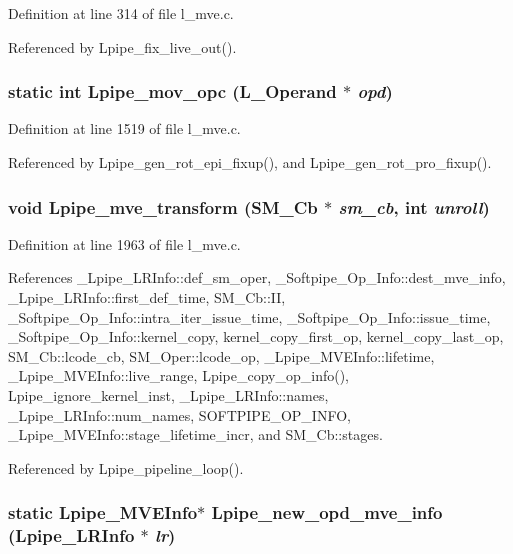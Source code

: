Definition at line 314 of file l\_\-mve.c.

Referenced by Lpipe\_\-fix\_\-live\_\-out().
\subsubsection{\setlength{\rightskip}{0pt plus 5cm}static int Lpipe\_\-mov\_\-opc (L\_\-Operand $\ast$ {\em opd})\hspace{0.3cm}{\tt  [static]}}\label{l__mve_8c_dbcc1c6752c12e5d507c9bb136143844}




Definition at line 1519 of file l\_\-mve.c.

Referenced by Lpipe\_\-gen\_\-rot\_\-epi\_\-fixup(), and Lpipe\_\-gen\_\-rot\_\-pro\_\-fixup().
\subsubsection{\setlength{\rightskip}{0pt plus 5cm}void Lpipe\_\-mve\_\-transform (\bf{SM\_\-Cb} $\ast$ {\em sm\_\-cb}, int {\em unroll})}\label{l__mve_8c_b3521b99ecff5fb6e631fe1caa6d81bc}




Definition at line 1963 of file l\_\-mve.c.

References \_\-Lpipe\_\-LRInfo::def\_\-sm\_\-oper, \_\-Softpipe\_\-Op\_\-Info::dest\_\-mve\_\-info, \_\-Lpipe\_\-LRInfo::first\_\-def\_\-time, SM\_\-Cb::II, \_\-Softpipe\_\-Op\_\-Info::intra\_\-iter\_\-issue\_\-time, \_\-Softpipe\_\-Op\_\-Info::issue\_\-time, \_\-Softpipe\_\-Op\_\-Info::kernel\_\-copy, kernel\_\-copy\_\-first\_\-op, kernel\_\-copy\_\-last\_\-op, SM\_\-Cb::lcode\_\-cb, SM\_\-Oper::lcode\_\-op, \_\-Lpipe\_\-MVEInfo::lifetime, \_\-Lpipe\_\-MVEInfo::live\_\-range, Lpipe\_\-copy\_\-op\_\-info(), Lpipe\_\-ignore\_\-kernel\_\-inst, \_\-Lpipe\_\-LRInfo::names, \_\-Lpipe\_\-LRInfo::num\_\-names, SOFTPIPE\_\-OP\_\-INFO, \_\-Lpipe\_\-MVEInfo::stage\_\-lifetime\_\-incr, and SM\_\-Cb::stages.

Referenced by Lpipe\_\-pipeline\_\-loop().
\subsubsection{\setlength{\rightskip}{0pt plus 5cm}static \bf{Lpipe\_\-MVEInfo}$\ast$ Lpipe\_\-new\_\-opd\_\-mve\_\-info (\bf{Lpipe\_\-LRInfo} $\ast$ {\em lr})\hspace{0.3cm}{\tt  [static]}}\label{l__mve_8c_46a16b2e81536e0801824c9354f817fe}




